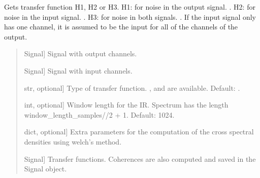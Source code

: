 \documentclass[letterpaper,10pt,english]{sphinxmanual}
\begin{document}
\begin{fulllineitems}
\label{\detokenize{modules/dsptoolbox.transfer_functions:dsptoolbox.transfer_functions.compute_transfer_function}}
\pysigstartsignatures
{}
\pysigstopsignatures
\sphinxAtStartPar
Gets transfer function H1, H2 or H3.
H1: for noise in the output signal. .
H2: for noise in the input signal. .
H3: for noise in both signals. .
If the input signal only has one channel, it is assumed to be the input
for all of the channels of the output.
\begin{quote}\begin{description}
\begin{description}
\sphinxlineitem{\sphinxstylestrong{output}}{[}Signal{]}
\sphinxAtStartPar
Signal with output channels.

\sphinxlineitem{\sphinxstylestrong{input}}{[}Signal{]}
\sphinxAtStartPar
Signal with input channels.

\sphinxlineitem{\sphinxstylestrong{mode}}{[}str, optional{]}
\sphinxAtStartPar
Type of transfer function. ,  and  are available.
Default: .

\sphinxlineitem{\sphinxstylestrong{window\_length\_samples}}{[}int, optional{]}
\sphinxAtStartPar
Window length for the IR. Spectrum has the length
window\_length\_samples//2 + 1. Default: 1024.

\sphinxlineitem{\sphinxstylestrong{**kwargs}}{[}dict, optional{]}
\sphinxAtStartPar
Extra parameters for the computation of the cross spectral densities
using welch’s method.

\end{description}

\begin{description}
\sphinxlineitem{\sphinxstylestrong{tf}}{[}Signal{]}
\sphinxAtStartPar
Transfer functions. Coherences are also computed and saved in the
Signal object.

\end{description}

\end{description}\end{quote}

\end{fulllineitems}
\end{document}
